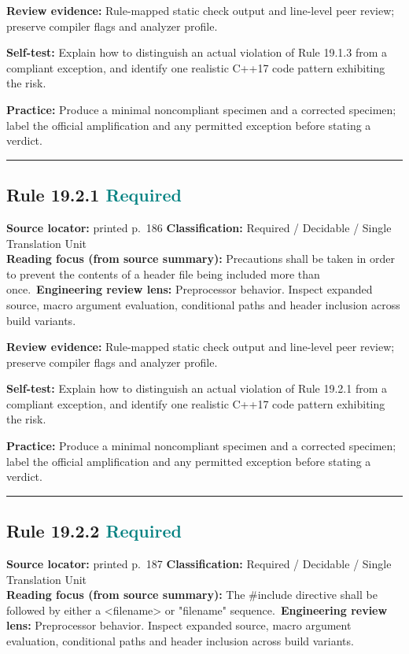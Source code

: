 \documentclass[10pt,letterpaper]{article}
\begin{document}
\textbf{Review evidence:} Rule-mapped static check output and line-level peer review; preserve compiler flags and analyzer profile.

\textbf{Self-test:} Explain how to distinguish an actual violation of Rule 19.1.3 from a compliant exception, and identify one realistic C++17 code pattern exhibiting the risk.\par
\textbf{Practice:} Produce a minimal noncompliant specimen and a corrected specimen; label the official amplification and any permitted exception before stating a verdict.
\smallskip\hrule\smallskip
\subsection*{Rule 19.2.1 \enspace \texorpdfstring{\small\textcolor{teal}{Required}}{Required}}
\noindent\textbf{Source locator:} printed p.~186 \quad\textbf{Classification:} Required / Decidable / Single Translation Unit\\
\textbf{Reading focus (from source summary):} Precautions shall be taken in order to prevent the contents of a header file being included more than once.\
\textbf{Engineering review lens:} Preprocessor behavior. Inspect expanded source, macro argument evaluation, conditional paths and header inclusion across build variants.

\textbf{Review evidence:} Rule-mapped static check output and line-level peer review; preserve compiler flags and analyzer profile.

\textbf{Self-test:} Explain how to distinguish an actual violation of Rule 19.2.1 from a compliant exception, and identify one realistic C++17 code pattern exhibiting the risk.\par
\textbf{Practice:} Produce a minimal noncompliant specimen and a corrected specimen; label the official amplification and any permitted exception before stating a verdict.
\smallskip\hrule\smallskip
\subsection*{Rule 19.2.2 \enspace \texorpdfstring{\small\textcolor{teal}{Required}}{Required}}
\noindent\textbf{Source locator:} printed p.~187 \quad\textbf{Classification:} Required / Decidable / Single Translation Unit\\
\textbf{Reading focus (from source summary):} The \#include directive shall be followed by either a \textless{}filename\textgreater{} or "filename" sequence.\
\textbf{Engineering review lens:} Preprocessor behavior. Inspect expanded source, macro argument evaluation, conditional paths and header inclusion across build variants.
\end{document}
